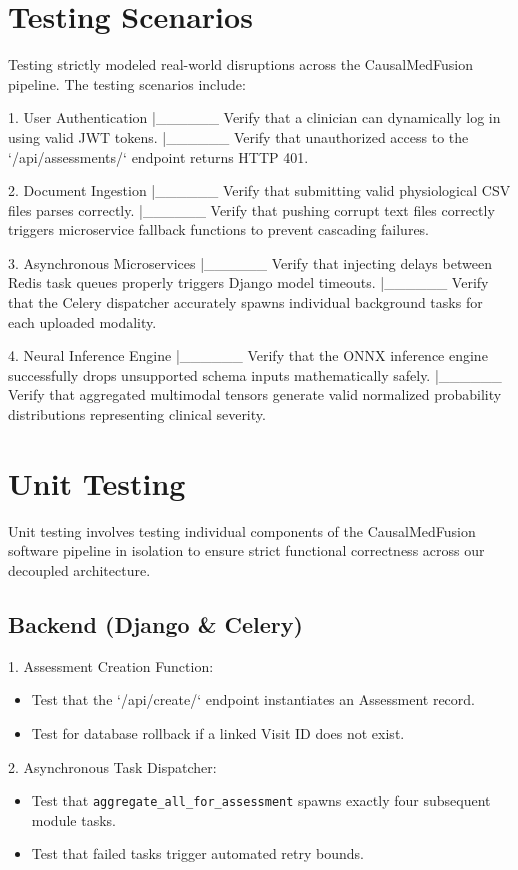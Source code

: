 \documentclass{fisatprojectfinal}
\begin{document}
\section{Testing Scenarios}
Testing strictly modeled real-world disruptions across the CausalMedFusion pipeline. The testing scenarios include:

1. User Authentication
|______ Verify that a clinician can dynamically log in using valid JWT tokens.
|______ Verify that unauthorized access to the `/api/assessments/` endpoint returns HTTP 401.

2. Document Ingestion
|______ Verify that submitting valid physiological CSV files parses correctly.
|______ Verify that pushing corrupt text files correctly triggers microservice fallback functions to prevent cascading failures.

3. Asynchronous Microservices
|______ Verify that injecting delays between Redis task queues properly triggers Django model timeouts.
|______ Verify that the Celery dispatcher accurately spawns individual background tasks for each uploaded modality.

4. Neural Inference Engine
|______ Verify that the ONNX inference engine successfully drops unsupported schema inputs mathematically safely.
|______ Verify that aggregated multimodal tensors generate valid normalized probability distributions representing clinical severity.

\section{Unit Testing}
Unit testing involves testing individual components of the CausalMedFusion software pipeline in isolation to ensure strict functional correctness across our decoupled architecture.

\subsection*{Backend (Django \& Celery)}
1. Assessment Creation Function:
\begin{itemize}
    \item Test that the `/api/create/` endpoint instantiates an Assessment record.
    \item Test for database rollback if a linked Visit ID does not exist.
\end{itemize}

2. Asynchronous Task Dispatcher:
\begin{itemize}
    \item Test that \texttt{aggregate\_all\_for\_assessment} spawns exactly four subsequent module tasks.
    \item Test that failed tasks trigger automated retry bounds.
\end{itemize}
\end{document}
